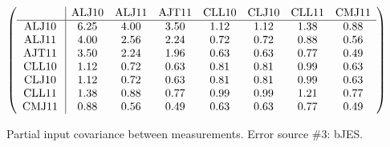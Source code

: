 \begin{table}[H]
\scriptsize
\begin{center}
\renewcommand{\arraystretch}{1.1}
\begin{math}\left(\begin{array}{c|ccccccc}
 & \mathrm{ALJ10} & 
\mathrm{ALJ11} & 
\mathrm{AJT11} & 
\mathrm{CLL10} & 
\mathrm{CLJ10} & 
\mathrm{CLL11} & 
\mathrm{CMJ11} \\
\hline
\mathrm{ALJ10} \hspace*{2pt} &       6.25 &       4.00 &       3.50 &       1.12 &       1.12 &       1.38 &       0.88 \\
\mathrm{ALJ11} \hspace*{2pt} &       4.00 &       2.56 &       2.24 &       0.72 &       0.72 &       0.88 &       0.56 \\
\mathrm{AJT11} \hspace*{2pt} &       3.50 &       2.24 &       1.96 &       0.63 &       0.63 &       0.77 &       0.49 \\
\mathrm{CLL10} \hspace*{2pt} &       1.12 &       0.72 &       0.63 &       0.81 &       0.81 &       0.99 &       0.63 \\
\mathrm{CLJ10} \hspace*{2pt} &       1.12 &       0.72 &       0.63 &       0.81 &       0.81 &       0.99 &       0.63 \\
\mathrm{CLL11} \hspace*{2pt} &       1.38 &       0.88 &       0.77 &       0.99 &       0.99 &       1.21 &       0.77 \\
\mathrm{CMJ11} \hspace*{2pt} &       0.88 &       0.56 &       0.49 &       0.63 &       0.63 &       0.77 &       0.49 \\
\end{array}\right)\end{math}
\caption{Partial input covariance between measurements. Error source \#3: bJES.}
\renewcommand{\arraystretch}{1}
\end{center}
\end{table}
